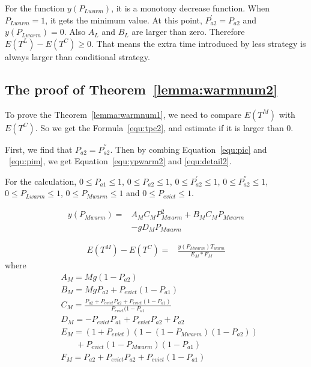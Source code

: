 For the function $y(P_{Lwarm})$, it is a monotony decrease function. When $P_{Lwarm} = 1$, it gets the minimum value.
At this point, $P_{a2}^{'} = P_{a2}$ and $y(P_{Lwarm}) = 0$.
Also $A_{L}$ and $B_{L}$ are larger than zero.
Therefore $E(T^{L}) - E(T^{C})\geq 0$.
That means the extra time introduced by less {\vwarm} strategy is always larger than conditional {\vwarm} strategy.

\subsection{The proof of Theorem~\ref{lemma:warmnum2}}
To prove the Theorem~\ref{lemma:warmnum1}, we need to compare $E(T^{M})$ with $E(T^{C})$.
So we get the Formula~\ref{equ:tpc2}, and estimate if it is larger than $0$.

First, we find that $P_{a2} = P_{a2}^{''}$. 
Then by combing Equation~\ref{equ:pic} and ~\ref{equ:pim}, we get Equation~\ref{equ:ypwarm2} and \ref{equ:detail2}.

For the calculation, $0 \leq P_{a1} \leq 1$, $0 \leq P_{a2} \leq 1$, $0 \leq P_{a2}^{'} \leq 1$, $0 \leq P_{a2}^{''} \leq 1$, $0 \leq P_{Lwarm} \leq 1$, $0 \leq P_{Mwarm} \leq 1$
 and $0 \leq P_{evict} \leq 1$.

\begin{equation}
\label{equ:ypwarm2}
\begin{split}
y(P_{Mwarm}) = & A_{M}C_{M}P_{Mwarm}^2+B_{M}C_{M}P_{Mwarm} \\
&-gD_{M}P_{Mwarm} \,
\end{split}\end{equation}

\begin{equation}
\label{equ:detail2}
\begin{split}
E(T^{M}) - E(T^{C}) = &\frac{y(P_{Mwarm})T_{warm}}{E_{M}*F_{M}}
\end{split}\end{equation}
where
\begin{equation*}
\begin{split}
&A_{M}= Mg(1-P_{a2})\\
&B_{M}=MgP_{a2}+P_{evict}(1-P_{a1})\\
&C_{M}=\frac{P_{a2}+P_{evict}P_{a2}+P_{evict}(1-P_{a1})}{P_{evict}(1-P_{a1}}\\
&D_{M}=-P_{evict}P_{a1}+P_{evict}P_{a2}+P_{a2}\\
&E_{M}=(1+P_{evict})(1-(1-P_{Mwarm})(1-P_{a2})) \\& \ \ \ \ \ \ \ \ +P_{evict}(1-P_{Mwarm})(1-P_{a1})\\
&F_{M}=P_{a2}+P_{evict}P_{a2}+P_{evict}(1-P_{a1})
\end{split}\end{equation*}


